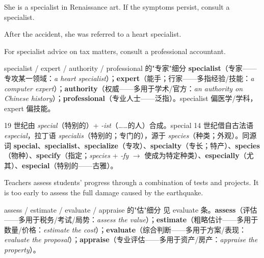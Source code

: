 \documentclass[../main.tex]{subfiles}
\begin{document}

{She is a specialist in Renaissance art.}
{If the symptoms persist, consult a specialist.}

{After the accident, she was referred to a heart specialist.}

{For specialist advice on tax matters, consult a professional accountant.}

\begin{gram}{specialist / expert / authority / professional 的"专家"细分}
\textbf{specialist}（专家——专攻某一领域：\textit{a heart specialist}）；\textbf{expert}（能手；行家——多指经验/技能：\textit{a computer expert}）；\textbf{authority}（权威——多用于学术/官方：\textit{an authority on Chinese history}）；\textbf{professional}（专业人士——泛指）。specialist 偏医学/学科，expert 偏技能。
\end{gram}

\begin{origin}
19 世纪由 \textit{special}（特别的）+ \textit{-ist}（……的人）合成。special 14 世纪借自古法语 \textit{especial}，拉丁语 \textit{specialis}（特别的；专门的），源于 \textit{species}（种类；外观）。同源词 \textbf{special}、\textbf{specialist}、\textbf{specialize}（专攻）、\textbf{specialty}（专长；特产）、\textbf{species}（物种）、\textbf{specify}（指定；\textit{species} + \textit{-fy} $\to$ 使成为特定种类）、\textbf{especially}（尤其）、\textbf{especial}（特别的——古雅）。
\end{origin}


{Teachers assess students' progress through a combination of tests and projects.}
{It is too early to assess the full damage caused by the earthquake.}

\begin{gram}{assess / estimate / evaluate / appraise 的"估"细分}
见 evaluate 条。\textbf{assess}（评估——多用于税务/考试/局势：\textit{assess the value}）；\textbf{estimate}（粗略估计——多用于数量/价格：\textit{estimate the cost}）；\textbf{evaluate}（综合判断——多用于方案/表现：\textit{evaluate the proposal}）；\textbf{appraise}（专业评估——多用于资产/房产：\textit{appraise the property}）。
\end{gram}
\end{document}
